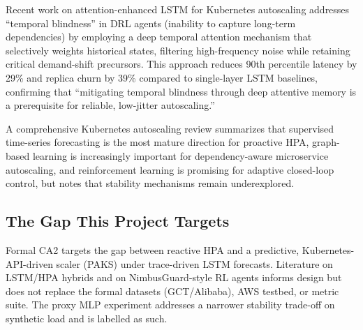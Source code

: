 Recent work on attention-enhanced LSTM for Kubernetes autoscaling \cite{AttentionLSTM26} addresses ``temporal blindness'' in DRL agents (inability to capture long-term dependencies) by employing a deep temporal attention mechanism that selectively weights historical states, filtering high-frequency noise while retaining critical demand-shift precursors. This approach reduces 90th percentile latency by 29\% and replica churn by 39\% compared to single-layer LSTM baselines, confirming that ``mitigating temporal blindness through deep attentive memory is a prerequisite for reliable, low-jitter autoscaling.''

A comprehensive Kubernetes autoscaling review \cite{K8sAutoscalingReview26} summarizes that supervised time-series forecasting is the most mature direction for proactive HPA, graph-based learning is increasingly important for dependency-aware microservice autoscaling, and reinforcement learning is promising for adaptive closed-loop control, but notes that stability mechanisms remain underexplored.

\subsection{The Gap This Project Targets}

Formal CA2 targets the gap between reactive HPA and a predictive, Kubernetes-API-driven scaler (PAKS) under trace-driven LSTM forecasts. Literature on LSTM/HPA hybrids and on NimbusGuard-style RL agents informs design but does not replace the formal datasets (GCT/Alibaba), AWS testbed, or metric suite. The proxy MLP experiment addresses a narrower stability trade-off on synthetic load and is labelled as such.

